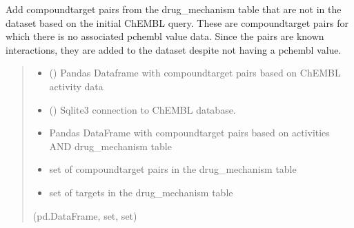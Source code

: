 \documentclass[letterpaper,10pt,english]{sphinxmanual}
\begin{document}
\begin{fulllineitems}
\label{\detokenize{get_drug_mechanism_ct_pairs:get_drug_mechanism_ct_pairs.add_drug_mechanism_ct_pairs}}
\pysigstartsignatures
{}
\pysigstopsignatures
\sphinxAtStartPar
Add compound\sphinxhyphen{}target pairs from the drug\_mechanism table that are not in the dataset based on the initial ChEMBL query.
These are compound\sphinxhyphen{}target pairs for which there is no associated pchembl value data.
Since the pairs are known interactions, they are added to the dataset despite not having a pchembl value.
\begin{quote}\begin{description}
\begin{itemize}
\item {} 
\sphinxAtStartPar
{} () \textendash{} Pandas Dataframe with compound\sphinxhyphen{}target pairs based on ChEMBL activity data

\item {} 
\sphinxAtStartPar
{} () \textendash{} Sqlite3 connection to ChEMBL database.

\end{itemize}

\sphinxAtStartPar
\begin{itemize}
\item {} 
\sphinxAtStartPar
Pandas DataFrame with compound\sphinxhyphen{}target pairs based on activities AND drug\_mechanism table 

\item {} 
\sphinxAtStartPar
set of compound\sphinxhyphen{}target pairs in the drug\_mechanism table 

\item {} 
\sphinxAtStartPar
set of targets in the drug\_mechanism table

\end{itemize}


\sphinxAtStartPar
(pd.DataFrame, set, set)

\end{description}\end{quote}

\end{fulllineitems}
\end{document}
